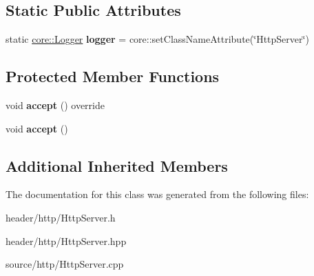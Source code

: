 \subsection*{Static Public Attributes}
\begin{DoxyCompactItemize}
\item 
\mbox{\label{classhttp_1_1_server_3_01_h_t_t_p_01_4_a7ad3be6764082d1ab2683c61430d3d04}} 
static \hyperlink{classcore_1_1_logger}{core\+::\+Logger} {\bfseries logger} = core\+::set\+Class\+Name\+Attribute(\char`\"{}Http\+Server\char`\"{})
\end{DoxyCompactItemize}
\subsection*{Protected Member Functions}
\begin{DoxyCompactItemize}
\item 
\mbox{\label{classhttp_1_1_server_3_01_h_t_t_p_01_4_a927b89d8b3e68a6ceb86bb6d82fa64a9}} 
void {\bfseries accept} () override
\item 
\mbox{\label{classhttp_1_1_server_3_01_h_t_t_p_01_4_a8e227fdc1397cfb6e11628fbc69b8a69}} 
void {\bfseries accept} ()
\end{DoxyCompactItemize}
\subsection*{Additional Inherited Members}


The documentation for this class was generated from the following files\+:\begin{DoxyCompactItemize}
\item 
header/http/Http\+Server.\+h\item 
header/http/Http\+Server.\+hpp\item 
source/http/Http\+Server.\+cpp\end{DoxyCompactItemize}
